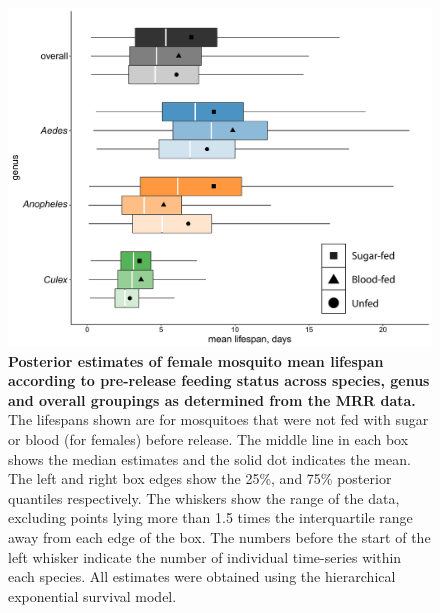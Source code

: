 \documentclass[12pt]{article}
\begin{document}
\begin{figure}[h]
	\centerline{\includegraphics[width=1\textwidth]{./Figure_files/mrr_female_blood_sugar.pdf}}
	\caption{\textbf{Posterior estimates of female mosquito mean lifespan according to pre-release feeding status across species, genus and overall groupings as determined from the MRR data.} The lifespans shown are for mosquitoes that were not fed with sugar or blood (for females) before release. The middle line in each box shows the median estimates and the solid dot indicates the mean. The left and right box edges show the 25\%, and 75\% posterior quantiles respectively. The whiskers show the range of the data, excluding points lying more than 1.5 times the interquartile range away from each edge of the box. The numbers before the start of the left whisker indicate the number of individual time-series within each species. All estimates were obtained using the hierarchical exponential survival model.}
	\label{fig:mrr_female_blood_sugar}
\end{figure}
\end{document}
